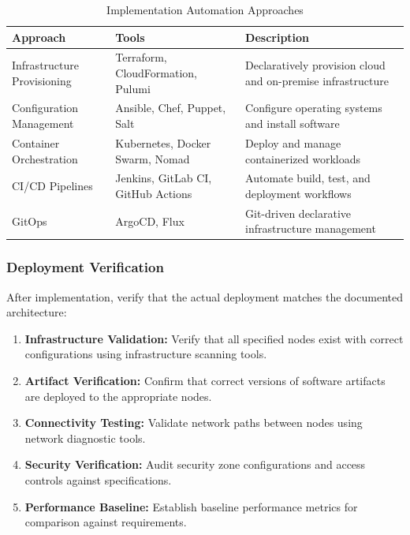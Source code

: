 \documentclass[11pt,letterpaper]{article}
\begin{document}
\begin{table}[H]
\centering
\caption{Implementation Automation Approaches}
\small
\begin{tabular}{@{}L{3cm}L{4.5cm}L{6cm}@{}}
\toprule
\textbf{Approach} & \textbf{Tools} & \textbf{Description} \\
\midrule
Infrastructure Provisioning & Terraform, CloudFormation, Pulumi & Declaratively provision cloud and on-premise infrastructure \\
\addlinespace
Configuration Management & Ansible, Chef, Puppet, Salt & Configure operating systems and install software \\
\addlinespace
Container Orchestration & Kubernetes, Docker Swarm, Nomad & Deploy and manage containerized workloads \\
\addlinespace
CI/CD Pipelines & Jenkins, GitLab CI, GitHub Actions & Automate build, test, and deployment workflows \\
\addlinespace
GitOps & ArgoCD, Flux & Git-driven declarative infrastructure management \\
\bottomrule
\end{tabular}
\end{table}

\subsubsection{Deployment Verification}

After implementation, verify that the actual deployment matches the documented architecture:

\begin{enumerate}
    \item \textbf{Infrastructure Validation:} Verify that all specified nodes exist with correct configurations using infrastructure scanning tools.
    
    \item \textbf{Artifact Verification:} Confirm that correct versions of software artifacts are deployed to the appropriate nodes.
    
    \item \textbf{Connectivity Testing:} Validate network paths between nodes using network diagnostic tools.
    
    \item \textbf{Security Verification:} Audit security zone configurations and access controls against specifications.
    
    \item \textbf{Performance Baseline:} Establish baseline performance metrics for comparison against requirements.
\end{enumerate}
\end{document}
